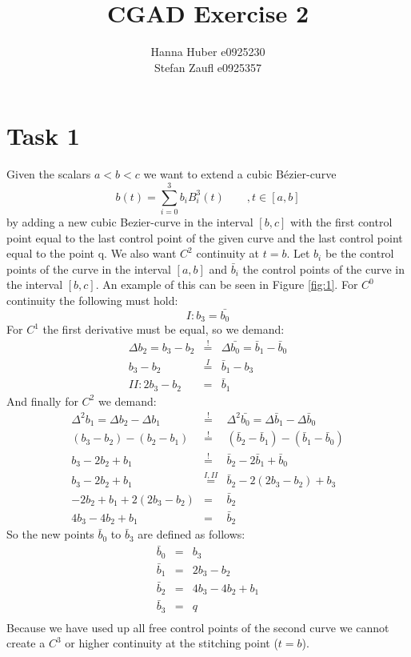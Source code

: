 \documentclass[12pt,a4paper]{article}
\title{CGAD Exercise 2}
\author{Hanna Huber e0925230\\Stefan Zaufl e0925357}
\begin{document}
\maketitle
\section{Task 1}
Given the scalars $a < b < c$ we want to extend a cubic Bézier-curve
\[ b(t) = \sum^{3}_{i=0}{b_iB^3_i(t)}\qquad ,t\in[a,b]\]
by adding a new cubic Bezier-curve in the interval $[b,c]$ with the first control point equal to the last control point of the given curve and the last control point equal to the point q. We also want $C^2$ continuity at $t=b$. Let $b_i$ be the control points of the curve in the interval $[a,b]$ and $\bar{b}_i$ the control points of the curve in the interval $[b,c]$. An example of this can be seen in Figure \ref{fig:1}. For $C^0$ continuity the following must hold:
\[ I: b_3 = \bar{b_0}\]
For $C^1$ the first derivative must be equal, so we demand:
\begin{eqnarray*}
\Delta b_2 = b_3 - b_2 & \overset{!}{=} & \Delta \bar{b_0} = \bar{b}_1 - \bar{b}_0 \\
b_3 - b_2 & \overset{I}{=} & \bar{b}_1 - b_3 \\
II: 2b_3 - b_2 & = & \bar{b}_1
\end{eqnarray*}
And finally for $C^2$ we demand:
\begin{eqnarray*}
\Delta^2 b_1 = \Delta b_2 - \Delta b_1 & \overset{!}{=} & \Delta^2 \bar{b_0} = \Delta \bar{b}_1 - \Delta \bar{b}_0 \\
(b_3 - b_2) - (b_2 - b_1) & \overset{!}{=} & (\bar{b}_2 - \bar{b}_1) - (\bar{b}_1 - \bar{b}_0) \\
b_3 - 2b_2 + b_1 & \overset{!}{=} & \bar{b}_2 - 2\bar{b}_1 + \bar{b}_0 \\
b_3 - 2b_2 + b_1 & \overset{I,II}{=} & \bar{b}_2 - 2(2b_3 - b_2) + b_3 \\
-2b_2 + b_1 + 2(2b_3 - b_2) & = & \bar{b}_2 \\
4b_3 - 4b_2 + b_1 & = & \bar{b}_2
\end{eqnarray*}
So the new points $\bar{b}_0$ to $\bar{b}_3$ are defined as follows:
\begin{eqnarray*}
\bar{b}_0 & = & b_3 \\
\bar{b}_1 & = & 2b_3 - b_2 \\
\bar{b}_2 & = & 4b_3 - 4b_2 + b_1 \\
\bar{b}_3 & = & q \\
\end{eqnarray*}
Because we have used up all free control points of the second curve we cannot create a $C^3$ or higher continuity at the stitching point ($t=b$).
\end{document}
